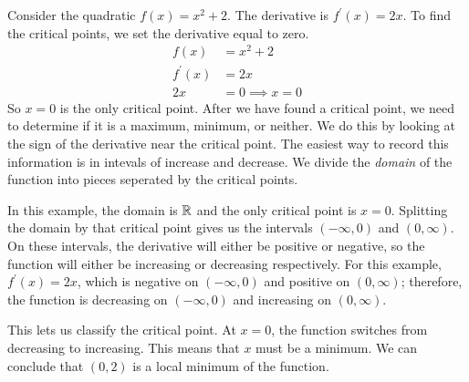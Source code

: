 \documentclass[fleqn]{report}
\begin{document}
\begin{example}
Consider the quadratic $f(x) = x^2 + 2$. The derivative is
$f^\prime(x) = 2x$. To find the critical points, we set the
derivative equal to zero.
\begin{align*}
f(x) & = x^2 + 2 \\
f^\prime(x) & = 2x \\
2x & = 0 \implies x = 0
\end{align*}
So $x=0$ is the only critical point. After we have found a
critical point, we need to determine if it is a maximum,
minimum, or neither. We do this by looking at the sign of the
derivative near the critical point. The easiest way to record
this information is in intevals of increase and decrease. We
divide the \emph{domain} of the function into pieces seperated
by the critical points. 

In this example, the domain is $\mathbb{R}$ and the only critical
point is $x=0$. Splitting the domain by that critical point
gives us the intervals $(-\infty, 0)$ and $(0,\infty)$. On
these intervals, the derivative will either be positive or
negative, so the function will either be increasing or
decreasing respectively. For this example, $f^\prime(x) =
2x$, which is negative on $(-\infty,0)$ and positive on $(0,
\infty)$; therefore, the function is decreasing on
$(-\infty,0)$ and increasing on $(0, \infty)$. 

This lets us classify the critical point. At $x=0$, the
function switches from decreasing to increasing. This means
that $x$ must be a minimum. We can conclude that $(0,2)$ is
a local minimum of the function.
\end{example}
\end{document}
